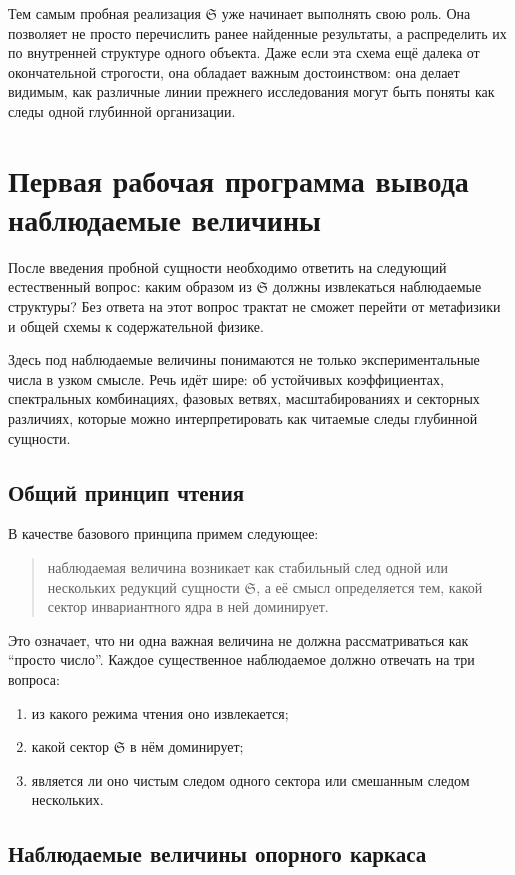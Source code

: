 \documentclass[12pt,a4paper]{article}
\begin{document}
Тем самым пробная реализация \(\mathfrak{S}\) уже начинает выполнять свою роль. Она позволяет не просто перечислить ранее найденные результаты, а распределить их по внутренней структуре одного объекта. Даже если эта схема ещё далека от окончательной строгости, она обладает важным достоинством: она делает видимым, как различные линии прежнего исследования могут быть поняты как следы одной глубинной организации.

\section{Первая рабочая программа вывода наблюдаемые величины}

После введения пробной сущности необходимо ответить на следующий естественный вопрос: каким образом из \(\mathfrak{S}\) должны извлекаться наблюдаемые структуры? Без ответа на этот вопрос трактат не сможет перейти от метафизики и общей схемы к содержательной физике.

Здесь под наблюдаемые величины понимаются не только экспериментальные числа в узком смысле. Речь идёт шире: об устойчивых коэффициентах, спектральных комбинациях, фазовых ветвях, масштабированиях и секторных различиях, которые можно интерпретировать как читаемые следы глубинной сущности.

\subsection{Общий принцип чтения}

В качестве базового принципа примем следующее:
\begin{quote}
наблюдаемая величина возникает как стабильный след одной или нескольких редукций сущности \(\mathfrak{S}\), а её смысл определяется тем, какой сектор инвариантного ядра в ней доминирует.
\end{quote}

Это означает, что ни одна важная величина не должна рассматриваться как ``просто число''. Каждое существенное наблюдаемое должно отвечать на три вопроса:
\begin{enumerate}
    \item из какого режима чтения оно извлекается;
    \item какой сектор \(\mathfrak{S}\) в нём доминирует;
    \item является ли оно чистым следом одного сектора или смешанным следом нескольких.
\end{enumerate}

\subsection{Наблюдаемые величины опорного каркаса}
\end{document}
